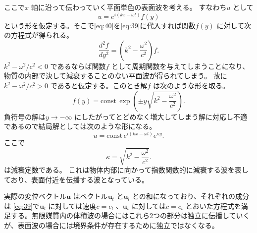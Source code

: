 \documentclass[dvipdfmx,11pt]{jsreport}
\numberwithin{equation}{chapter}
\numberwithin{table}{chapter}
\begin{document}
ここで$x$ 軸に沿って伝わっていく平面単色の表面波を考える。
すなわち$u$ として
\begin{equation}
\label{eq:40}
	u=e^{i(kx-\omega t)}f(y)
\end{equation}
という形を仮定する。そこで\eqref{eq:40}を\eqref{eq:39}に代入すれば関数$f(y)$ に対して次の方程式が得られる。
\begin{equation}
\label{eq:41}
	\frac{d^2f}{dy^2}=\left( k^2-\frac{\omega^2}{c^2} \right) f
.\end{equation}
$k^2 - \omega^2 /c^2<0$ であるならば関数$f$ として周期関数を与えてしまうことになり、
物質の内部で決して減衰することのない平面波が得られてしまう。
故に$k^2 -\omega^2 /c^2>0$ であると仮定する。このとき解$f$ は次のような形を取る。
\begin{equation}
\label{eq:42}
	f(y)=\mathrm{const}\, \exp \left( \pm y\sqrt{k^2-\frac{\omega^2}{c^2}}  \right) 
.\end{equation}
負符号の解は$y\to -\infty$ にしたがってとどめなく増大してしまう解に対応し不適であるので結局解としては次のような形になる。
\begin{equation}
\label{eq:43}
	u=\mathrm{const}\,e^{i(kx-\omega t)}e^{\kappa y}
.\end{equation}
ここで
\begin{equation}
\label{eq:44}
	\kappa = \sqrt{k^2-\frac{\omega^2}{c^2}} 
.\end{equation}
は減衰定数である。
これは物体内部に向かって指数関数的に減衰する波を表しており、表面付近を伝播する波となっている。

実際の変位ベクトル$\bm{u}$ はベクトル$\bm{u}_t$ と$\bm{u}_l$ との和になっており、それぞれの成分は
\eqref{eq:39}で$\bm{u}_l$ に対しては速度$c=c_l$ 、$\bm{u}_t$ に対しては$c=c_t$ とおいた方程式を満足する。無限媒質内の体積波の場合にはこれら2つの部分は独立に伝播していくが、表面波の場合には境界条件が存在するために独立ではなくなる。
\end{document}
